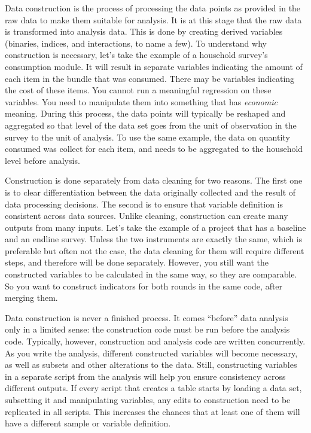Data construction is the process of processing the data points as provided in the raw data to make them suitable for analysis.
It is at this stage that the raw data is transformed into analysis data.
This is done by creating derived variables
(binaries, indices, and interactions, to name a few).
To understand why construction is necessary,
let's take the example of a household survey's consumption module.
It will result in separate variables indicating the 
amount of each item in the bundle that was consumed.
There may be variables indicating the cost of these items.
You cannot run a meaningful regression on these variables. 
You need to manipulate them into something that has \textit{economic} meaning. 
During this process, the data points will typically be reshaped and aggregated 
so that level of the data set goes from the unit of observation in the survey to the unit of analysis. 
To use the same example, the data on quantity consumed was collect for each item, and needs to be aggregated to the household level before analysis.


Construction is done separately from data cleaning for two reasons. 
The first one is to clear differentiation between the data originally collected and the result of data processing decisions.
The second is to ensure that variable definition is consistent across data sources. 
Unlike cleaning, construction can create many outputs from many inputs. 
Let's take the example of a project that has a baseline and an endline survey. 
Unless the two instruments are exactly the same, which is preferable but often not the case,  the data cleaning for them will require different steps, and therefore will be done separately. 
However, you still want the constructed variables to be calculated in the same way, so they are comparable.
So you want to construct indicators for both rounds in the same code, after merging them.

Data construction is never a finished process.
It comes ``before'' data analysis only in a limited sense: the construction code must be run before the analysis code.
Typically, however, construction and analysis code are written concurrently.
As you write the analysis, different constructed variables will become necessary, as well as subsets and other alterations to the data.
Still, constructing variables in a separate script from the analysis will help you ensure consistency across different outputs. 
If every script that creates a table starts by loading a data set, subsetting it and manipulating variables, any edits to construction need to be replicated in all scripts. 
This increases the chances that at least one of them will have a different sample or variable definition.


